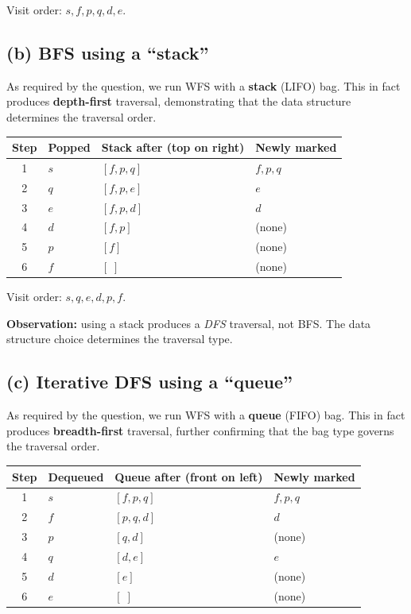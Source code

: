 \documentclass[11pt]{article}
\begin{document}
Visit order: $s, f, p, q, d, e$.

\subsection*{(b) BFS using a \textquotedblleft stack\textquotedblright}

As required by the question, we run WFS with a \textbf{stack} (LIFO) bag. This in fact produces \textbf{depth-first} traversal, demonstrating that the data structure determines the traversal order.

\begin{center}
\begin{tabular}{clll}
\toprule
Step & Popped & Stack after (top on right) & Newly marked \\
\midrule
1 & $s$ & $[f, p, q]$ & $f, p, q$ \\
2 & $q$ & $[f, p, e]$ & $e$ \\
3 & $e$ & $[f, p, d]$ & $d$ \\
4 & $d$ & $[f, p]$   & (none) \\
5 & $p$ & $[f]$       & (none) \\
6 & $f$ & $[\;]$      & (none) \\
\bottomrule
\end{tabular}
\end{center}

Visit order: $s, q, e, d, p, f$.

\textbf{Observation:} using a stack produces a \emph{DFS} traversal, not BFS.  The data structure choice determines the traversal type.

\subsection*{(c) Iterative DFS using a \textquotedblleft queue\textquotedblright}

As required by the question, we run WFS with a \textbf{queue} (FIFO) bag. This in fact produces \textbf{breadth-first} traversal, further confirming that the bag type governs the traversal order.

\begin{center}
\begin{tabular}{clll}
\toprule
Step & Dequeued & Queue after (front on left) & Newly marked \\
\midrule
1 & $s$ & $[f, p, q]$ & $f, p, q$ \\
2 & $f$ & $[p, q, d]$ & $d$ \\
3 & $p$ & $[q, d]$    & (none) \\
4 & $q$ & $[d, e]$    & $e$ \\
5 & $d$ & $[e]$       & (none) \\
6 & $e$ & $[\;]$      & (none) \\
\bottomrule
\end{tabular}
\end{center}
\end{document}

